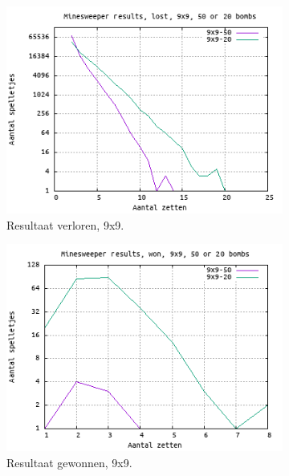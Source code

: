 \documentclass[10pt]{article}
\begin{document}
\hfill
\begin{figure}[H]
  \centering
  \begin{subfigure}{.49\textwidth}
    \centering
    \includegraphics[width=1\linewidth]{plot_9_9_lost}
    \caption{Resultaat verloren, 9x9. }
    \label{fig:plot_9_9_lost}
  \end{subfigure}
  \begin{subfigure}{.49\textwidth}
    \centering
    \includegraphics[width=1\linewidth]{plot_9_9_won}
    \caption{Resultaat gewonnen, 9x9. }
    \label{fig:plot_9_9_won}
  \end{subfigure}
  \begin{subfigure}{.49\textwidth}
    \centering

\end{subfigure}
\end{figure}
\end{document}
